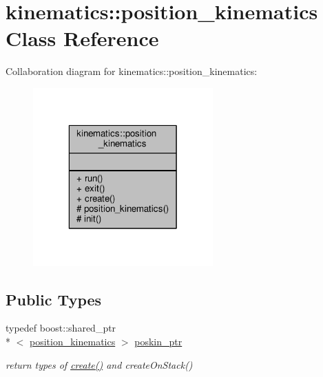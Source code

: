 \hypertarget{classkinematics_1_1position__kinematics}{\section{kinematics\-:\-:position\-\_\-kinematics Class Reference}
\label{classkinematics_1_1position__kinematics}
}


Collaboration diagram for kinematics\-:\-:position\-\_\-kinematics\-:
\nopagebreak
\begin{figure}[H]
\begin{center}
\leavevmode
\includegraphics[width=196pt]{classkinematics_1_1position__kinematics__coll__graph}
\end{center}
\end{figure}
\subsection*{Public Types}
\begin{DoxyCompactItemize}
\item 
\hypertarget{classkinematics_1_1position__kinematics_a53ee0691aa91508e59b930b21dd0edad}{typedef boost\-::shared\-\_\-ptr\\*
$<$ \hyperlink{classkinematics_1_1position__kinematics}{position\-\_\-kinematics} $>$ \hyperlink{classkinematics_1_1position__kinematics_a53ee0691aa91508e59b930b21dd0edad}{poskin\-\_\-ptr}}\label{classkinematics_1_1position__kinematics_a53ee0691aa91508e59b930b21dd0edad}

\begin{DoxyCompactList}\small\item\em return types of \hyperlink{classkinematics_1_1position__kinematics_a589bbfbe9e504e5b9f74755b692cab8b}{create()} and create\-On\-Stack() \end{DoxyCompactList}\end{DoxyCompactItemize}

